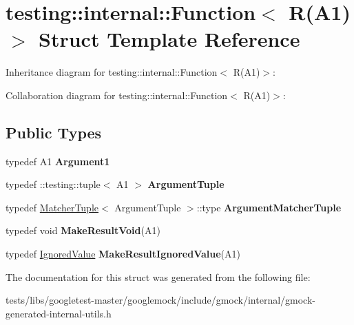\hypertarget{structtesting_1_1internal_1_1Function_3_01R_07A1_08_4}{}\section{testing\+:\+:internal\+:\+:Function$<$ R(A1)$>$ Struct Template Reference}
\label{structtesting_1_1internal_1_1Function_3_01R_07A1_08_4}


Inheritance diagram for testing\+:\+:internal\+:\+:Function$<$ R(A1)$>$\+:


Collaboration diagram for testing\+:\+:internal\+:\+:Function$<$ R(A1)$>$\+:
\subsection*{Public Types}
\begin{DoxyCompactItemize}
\item 
\mbox{\label{structtesting_1_1internal_1_1Function_3_01R_07A1_08_4_aca36c8586218fd015cc4736dc8d4c14f}} 
typedef A1 {\bfseries Argument1}
\item 
\mbox{\label{structtesting_1_1internal_1_1Function_3_01R_07A1_08_4_afd48881a58d72658e547a170fb0f2087}} 
typedef \+::testing\+::tuple$<$ A1 $>$ {\bfseries Argument\+Tuple}
\item 
\mbox{\label{structtesting_1_1internal_1_1Function_3_01R_07A1_08_4_a0e35671ae43c3d3310893e1d6d895d06}} 
typedef \hyperlink{structtesting_1_1internal_1_1MatcherTuple}{Matcher\+Tuple}$<$ Argument\+Tuple $>$\+::type {\bfseries Argument\+Matcher\+Tuple}
\item 
\mbox{\label{structtesting_1_1internal_1_1Function_3_01R_07A1_08_4_aab10495172953eb51fc3940c4c1e890a}} 
typedef void {\bfseries Make\+Result\+Void}(A1)
\item 
\mbox{\label{structtesting_1_1internal_1_1Function_3_01R_07A1_08_4_a8fa56b9e05cb029ec7c8415ee352f865}} 
typedef \hyperlink{classtesting_1_1internal_1_1IgnoredValue}{Ignored\+Value} {\bfseries Make\+Result\+Ignored\+Value}(A1)
\end{DoxyCompactItemize}


The documentation for this struct was generated from the following file\+:\begin{DoxyCompactItemize}
\item 
tests/libs/googletest-\/master/googlemock/include/gmock/internal/gmock-\/generated-\/internal-\/utils.\+h\end{DoxyCompactItemize}
